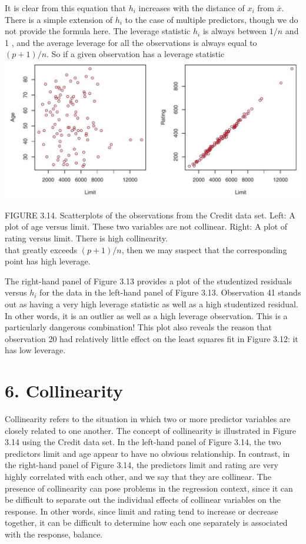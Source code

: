 \documentclass[10pt]{article}
\begin{document}
It is clear from this equation that $h_{i}$ increases with the distance of $x_{i}$ from $\bar{x}$. There is a simple extension of $h_{i}$ to the case of multiple predictors, though we do not provide the formula here. The leverage statistic $h_{i}$ is always between $1 / n$ and 1 , and the average leverage for all the observations is always equal to $(p+1) / n$. So if a given observation has a leverage statistic\\
\includegraphics[max width=\textwidth, center]{2025_05_05_efe77898333945044de4g-114}

FIGURE 3.14. Scatterplots of the observations from the Credit data set. Left: A plot of age versus limit. These two variables are not collinear. Right: A plot of rating versus limit. There is high collinearity.\\
that greatly exceeds $(p+1) / n$, then we may suspect that the corresponding point has high leverage.

The right-hand panel of Figure 3.13 provides a plot of the studentized residuals versus $h_{i}$ for the data in the left-hand panel of Figure 3.13. Observation 41 stands out as having a very high leverage statistic as well as a high studentized residual. In other words, it is an outlier as well as a high leverage observation. This is a particularly dangerous combination! This plot also reveals the reason that observation 20 had relatively little effect on the least squares fit in Figure 3.12: it has low leverage.

\section*{6. Collinearity}
Collinearity refers to the situation in which two or more predictor variables are closely related to one another. The concept of collinearity is illustrated in Figure 3.14 using the Credit data set. In the left-hand panel of Figure 3.14, the two predictors limit and age appear to have no obvious relationship. In contrast, in the right-hand panel of Figure 3.14, the predictors limit and rating are very highly correlated with each other, and we say that they are collinear. The presence of collinearity can pose problems in the regression context, since it can be difficult to separate out the individual effects of collinear variables on the response. In other words, since limit and rating tend to increase or decrease together, it can be difficult to determine how each one separately is associated with the response, balance.
\end{document}
